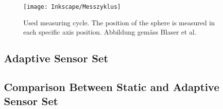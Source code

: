 \begin{figure}[!htb]
    \centering
    \texttt{[image: Inkscape/Messzyklus]} %
    \caption[Measuring cycle]{Used measuring cycle. The position of the sphere is measured in each specific axis position. Abbildung gemäss Blaser et al. \cite{Blaser_2017}}
    \label{fig:messzyklus.}
\end{figure}







\subsection{Adaptive Sensor Set}
\label{sec:adaptive_sensor_set}



\subsection{Comparison Between Static and Adaptive Sensor Set}
\label{sec:comparison_static_adaptive}


